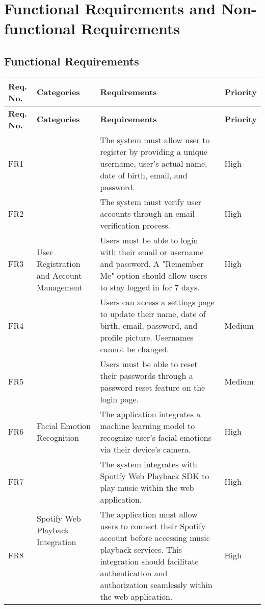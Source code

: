 \section{Functional Requirements and Non-functional Requirements}
\subsection{Functional Requirements}
\begin{longtable}{ |m{1cm}|m{3.5cm}|m{7cm}|m{1.5cm}| }
    \hline
    \textbf{Req. No.} & \textbf{Categories} & \textbf{Requirements} & \textbf{Priority} \\
    \hline
    \endfirsthead

    \hline
    \textbf{Req. No.} & \textbf{Categories} & \textbf{Requirements} & \textbf{Priority} \\
    \hline
    \endhead
    FR1 & \multirow{5}{=}{User Registration and Account Management} & The system must allow user to register by providing a unique username, user's actual name, date of birth, email, and password. & High \\
    \cline{1-1} \cline{3-4}
    FR2 &  & The system must verify user accounts through an email verification process. & High \\
    \cline{1-1} \cline{3-4}
    FR3 &  & Users must be able to login with their email or username and password. A "Remember Me" option should allow users to stay logged in for 7 days. & High \\
    \cline{1-1} \cline{3-4}
    FR4 &  & Users can access a settings page to update their name, date of birth, email, password, and profile picture. Usernames cannot be changed. & Medium \\
    \cline{1-1} \cline{3-4}
    FR5 &  & Users must be able to reset their passwords through a password reset feature on the login page. & Medium \\
    \hline
    FR6 & Facial Emotion Recognition & The application integrates a machine learning model to recognize user's facial emotions via their device's camera. & High \\
    \hline
    FR7 & \multirow{2}{=}{Spotify Web Playback Integration} & The system integrates with Spotify Web Playback SDK to play music within the web application. & High \\
    \cline{1-1} \cline{3-4}
    FR8 &  & The application must allow users to connect their Spotify account before accessing music playback services. This integration should facilitate authentication and authorization seamlessly within the web application. & High \\

\end{longtable}
